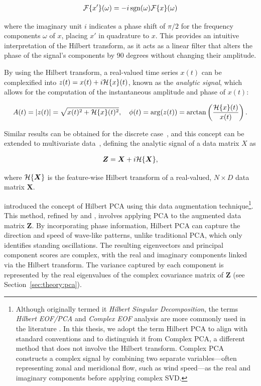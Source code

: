 \begin{align}\label{eq:theory:hilbert_transform_frequency}
    \mathcal{F}\{x'\}(\omega) = -i \operatorname*{sgn} (\omega) \mathcal{F}\{x\}(\omega)
\end{align}

where the imaginary unit $i$ indicates a phase shift of $\pi/2$ for the frequency components $\omega$ of $x$, placing $x'$ in quadrature to $x$. This provides an intuitive interpretation of the Hilbert transform, as it acts as a linear filter that alters the phase of the signal's components by 90 degrees without changing their amplitude.

By using the Hilbert transform, a real-valued time series $x(t)$ can be complexified into $z(t) = x(t) + i \mathcal{H}\{x\}(t)$, known as the \textit{analytic signal}, which allows for the computation of the instantaneous amplitude and phase of $x(t)$:

\begin{align}
    A(t) = |z(t)| = \sqrt{x(t)^2 + \mathcal{H}\{x\}(t)^2}, \quad \phi(t) = \arg(z(t)) = \arctan \left( \frac{\mathcal{H}\{x\}(t)}{x(t)} \right).
\end{align}

Similar results can be obtained for the discrete case~\cite[][pp. 942-956]{oppenheim_discrete-time_2010}, and this concept can be extended to multivariate data~\cite[e.g.][pp. 105-106]{hannachi_patterns_2021}, 
defining the analytic signal of a data matrix $X$ as

\begin{align}
    \bm{Z} = \bm{X} + i \mathcal{H}\{\bm{X}\},
\end{align}

where $\mathcal{H}\{\bm{X}\}$ is the feature-wise Hilbert transform of a real-valued, $N\times D$ data matrix $\bm{X}$. 


\citet{rasmusson_biennial_1981} introduced the concept of Hilbert PCA using this data augmentation technique\footnote{Although \citet{rasmusson_biennial_1981} originally termed it \textit{Hilbert Singular Decomposition}, the terms \textit{Hilbert EOF/PCA} and \textit{Complex EOF} analysis are more commonly used in the literature \cite{jolliffe_principal_2002,storch_statistical_1999,hannachi_patterns_2021,burger_intraseasonal_2021}.     In this thesis, we adopt the term Hilbert PCA to align with standard conventions and to distinguish it from Complex PCA, a different method that does not involve the Hilbert transform. Complex PCA constructs a complex signal by combining two separate variables---often representing zonal and meridional flow, such as wind speed---as the real and imaginary components before applying complex SVD.}. This method, refined by \citet{barnett_interaction_1983} and \citet{horel_complex_1984}, involves applying PCA to the augmented data matrix $\bm{Z}$. By incorporating phase information, Hilbert PCA can capture the direction and speed of wave-like patterns, unlike traditional PCA, which only identifies standing oscillations. The resulting eigenvectors and principal component scores are complex, with the real and imaginary components linked via the Hilbert transform. The variance captured by each component is represented by the real eigenvalues of the complex covariance matrix of $\bm{Z}$ (see Section~\ref{sec:theory:pca}).

